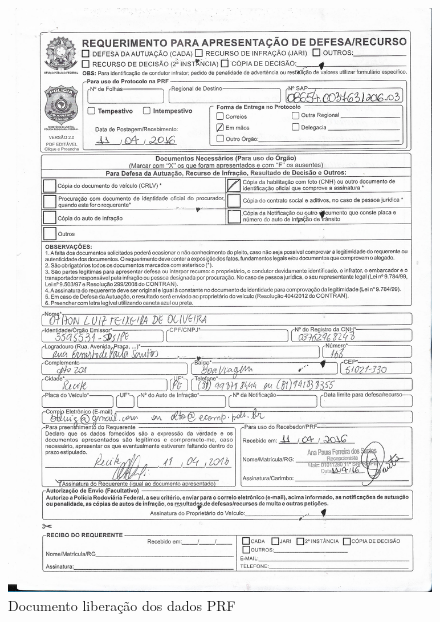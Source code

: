 \begin{figure}[ht!]
	\centering
		\caption{Documento liberação dos dados PRF}
		\includegraphics[scale=0.25]{Figuras/Anexos/A1-PRFDadospg_001.pdf}
		\qquad \quad \quad

\end{figure}
